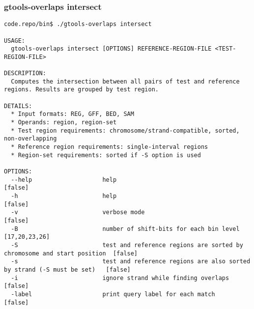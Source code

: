 \subsubsection{gtools-overlaps intersect}\label{gtools-overlaps_intersect}
\begin{lstlisting}
code.repo/bin$ ./gtools-overlaps intersect

USAGE:
  gtools-overlaps intersect [OPTIONS] REFERENCE-REGION-FILE <TEST-REGION-FILE>

DESCRIPTION:
  Computes the intersection between all pairs of test and reference regions. Results are grouped by test region.

DETAILS:
  * Input formats: REG, GFF, BED, SAM
  * Operands: region, region-set
  * Test region requirements: chromosome/strand-compatible, sorted, non-overlapping
  * Reference region requirements: single-interval regions
  * Region-set requirements: sorted if -S option is used

OPTIONS:
  --help                    help                                                                    [false]
  -h                        help                                                                    [false]
  -v                        verbose mode                                                            [false]
  -B                        number of shift-bits for each bin level                                 [17,20,23,26]
  -S                        test and reference regions are sorted by chromosome and start position  [false]
  -s                        test and reference regions are also sorted by strand (-S must be set)   [false]
  -i                        ignore strand while finding overlaps                                    [false]
  -label                    print query label for each match                                        [false]
\end{lstlisting}
%
